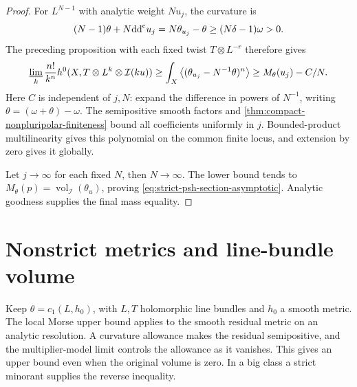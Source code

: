 \begin{proof}
For $L^{N-1}$ with analytic weight $Nu_j$, the curvature is
\[
 (N-1)\theta+N\mathrm{dd}^{\mathrm{c}} u_j=N\theta_{u_j}-\theta
       \geq(N\delta-1)\omega>0.
\]
The preceding proposition with each fixed twist $T\otimes L^{-r}$ therefore gives
\[
 \varliminf_k\frac{n!}{k^n}h^0(X,T\otimes L^k\otimes\mathcal I(ku))
       \geq\int_X\left\langle(\theta_{u_j}-N^{-1}\theta)^n\right\rangle
       \geq M_\theta(u_j)-C/N.
\]
Here $C$ is independent of $j,N$: expand the difference in powers of $N^{-1}$, writing $\theta=(\omega+\theta)-\omega$. The semipositive smooth factors and \cref{thm:compact-nonpluripolar-finiteness} bound all coefficients uniformly in $j$. Bounded-product multilinearity gives this polynomial on the common finite locus, and extension by zero gives it globally.

Let $j\to\infty$ for each fixed $N$, then $N\to\infty$. The lower bound tends to $M_\theta(p)=\operatorname{vol}_{\mathcal I}(\theta_u)$, proving \eqref{eq:strict-psh-section-asymptotic}. Analytic goodness supplies the final mass equality.
\end{proof}

\section{Nonstrict metrics and line-bundle volume}
\label{sec:nonstrict-section-volume}
Keep $\theta=c_1(L,h_0)$, with $L,T$ holomorphic line bundles and $h_0$ a smooth metric. The local Morse upper bound applies to the smooth residual metric on an analytic resolution. A curvature allowance makes the residual semipositive, and the multiplier-model limit controls the allowance as it vanishes. This gives an upper bound even when the original volume is zero. In a big class a strict minorant supplies the reverse inequality.

